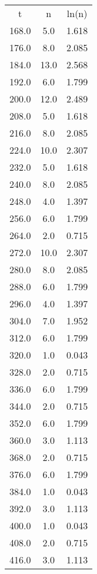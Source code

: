 \begin{table}
\begin{tabular}{ccc}
t & n & ln(n) \\
168.0 & 5.0 & 1.618 \\
176.0 & 8.0 & 2.085 \\
184.0 & 13.0 & 2.568 \\
192.0 & 6.0 & 1.799 \\
200.0 & 12.0 & 2.489 \\
208.0 & 5.0 & 1.618 \\
216.0 & 8.0 & 2.085 \\
224.0 & 10.0 & 2.307 \\
232.0 & 5.0 & 1.618 \\
240.0 & 8.0 & 2.085 \\
248.0 & 4.0 & 1.397 \\
256.0 & 6.0 & 1.799 \\
264.0 & 2.0 & 0.715 \\
272.0 & 10.0 & 2.307 \\
280.0 & 8.0 & 2.085 \\
288.0 & 6.0 & 1.799 \\
296.0 & 4.0 & 1.397 \\
304.0 & 7.0 & 1.952 \\
312.0 & 6.0 & 1.799 \\
320.0 & 1.0 & 0.043 \\
328.0 & 2.0 & 0.715 \\
336.0 & 6.0 & 1.799 \\
344.0 & 2.0 & 0.715 \\
352.0 & 6.0 & 1.799 \\
360.0 & 3.0 & 1.113 \\
368.0 & 2.0 & 0.715 \\
376.0 & 6.0 & 1.799 \\
384.0 & 1.0 & 0.043 \\
392.0 & 3.0 & 1.113 \\
400.0 & 1.0 & 0.043 \\
408.0 & 2.0 & 0.715 \\
416.0 & 3.0 & 1.113 \\
\end{tabular}
\end{table}
